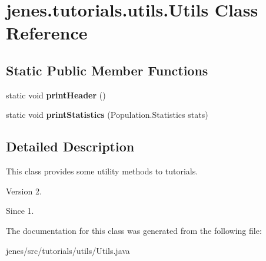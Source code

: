 \hypertarget{classjenes_1_1tutorials_1_1utils_1_1_utils}{\section{jenes.\-tutorials.\-utils.\-Utils Class Reference}
\label{classjenes_1_1tutorials_1_1utils_1_1_utils}
}
\subsection*{Static Public Member Functions}
\begin{DoxyCompactItemize}
\item 
\hypertarget{classjenes_1_1tutorials_1_1utils_1_1_utils_ae8a2289ea79a9c2a274d546b04de9e62}{static void {\bfseries print\-Header} ()}\label{classjenes_1_1tutorials_1_1utils_1_1_utils_ae8a2289ea79a9c2a274d546b04de9e62}

\item 
\hypertarget{classjenes_1_1tutorials_1_1utils_1_1_utils_a230e83ec1589f5d5b3b2991d34c5ea77}{static void {\bfseries print\-Statistics} (Population.\-Statistics stats)}\label{classjenes_1_1tutorials_1_1utils_1_1_utils_a230e83ec1589f5d5b3b2991d34c5ea77}

\end{DoxyCompactItemize}


\subsection{Detailed Description}
This class provides some utility methods to tutorials.

\begin{DoxyVersion}{Version}
2. 
\end{DoxyVersion}
\begin{DoxySince}{Since}
1. 
\end{DoxySince}


The documentation for this class was generated from the following file\-:\begin{DoxyCompactItemize}
\item 
jenes/src/tutorials/utils/Utils.\-java\end{DoxyCompactItemize}
